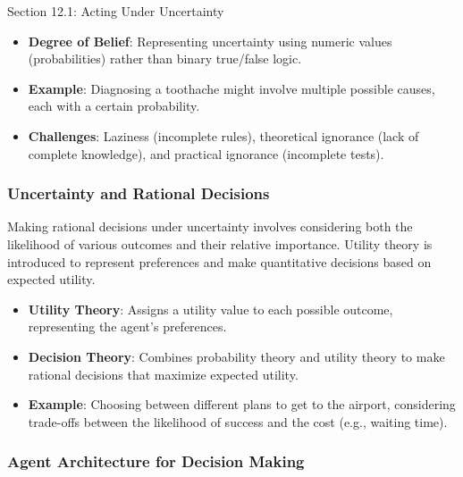\begin{notes}{Section 12.1: Acting Under Uncertainty}
    \begin{highlight}
    
        \begin{itemize}
            \item \textbf{Degree of Belief}: Representing uncertainty using numeric values (probabilities) rather than binary true/false logic.
            \item \textbf{Example}: Diagnosing a toothache might involve multiple possible causes, each with a certain probability.
            \item \textbf{Challenges}: Laziness (incomplete rules), theoretical ignorance (lack of complete knowledge), and practical ignorance (incomplete tests).
        \end{itemize}
    
    \end{highlight}
    
    \subsubsection*{Uncertainty and Rational Decisions}
    
    Making rational decisions under uncertainty involves considering both the likelihood of various outcomes and their relative importance. Utility theory is introduced to represent preferences and 
    make quantitative decisions based on expected utility.
    
    \begin{highlight}
    
        \begin{itemize}
            \item \textbf{Utility Theory}: Assigns a utility value to each possible outcome, representing the agent's preferences.
            \item \textbf{Decision Theory}: Combines probability theory and utility theory to make rational decisions that maximize expected utility.
            \item \textbf{Example}: Choosing between different plans to get to the airport, considering trade-offs between the likelihood of success and the cost (e.g., waiting time).
        \end{itemize}
    
    \end{highlight}
    
    \subsubsection*{Agent Architecture for Decision Making}
    

\end{notes}
